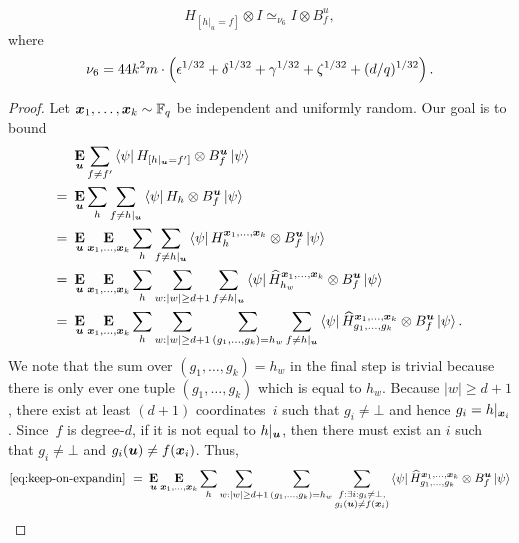 \begin{lemma}\label{lem:h-b-consistency}
\begin{equation*}
H_{[h|_u =f]} \otimes I \simeq_{\nu_6} I \otimes B^u_f,
\end{equation*}
where
\begin{equation*}
\nu_6 = 44 k^2m \cdot \left(\epsilon^{1/32} + \delta^{1/32} + \gamma^{1/32} + \zeta^{1/32} + (d/q)^{1/32}\right).
\end{equation*}
\end{lemma}
\begin{proof}
Let ${\boldsymbol{x}}_1, \ldots, {\boldsymbol{x}}_k \sim \mathbb F_q$ be independent and uniformly random.
Our goal is to bound
\begin{align}
&\mathop{\bf E\/}_{\boldsymbol{u}} \sum_{f \neq f'} \bra{\psi} H_{[h|_{\boldsymbol{u}} = f']} \otimes B^{\boldsymbol{u}}_f \ket{\psi}\nonumber\\
=~&\mathop{\bf E\/}_{\boldsymbol{u}} \sum_{h}\sum_{f \neq h|_{\boldsymbol{u}}} \bra{\psi} H_{h} \otimes B^{\boldsymbol{u}}_f \ket{\psi}\nonumber\\
=~&\mathop{\bf E\/}_{\boldsymbol{u}}\mathop{\bf E\/}_{{\boldsymbol{x}}_1, \ldots, {\boldsymbol{x}}_k} \sum_{h}\sum_{f \neq h|_{\boldsymbol{u}}} \bra{\psi} H^{{\boldsymbol{x}}_1, \ldots, {\boldsymbol{x}}_k}_{h} \otimes B^{\boldsymbol{u}}_f \ket{\psi}\nonumber\\
=~&\mathop{\bf E\/}_{\boldsymbol{u}}\mathop{\bf E\/}_{{\boldsymbol{x}}_1, \ldots, {\boldsymbol{x}}_k} \sum_{h} \sum_{w: |w| \geq d+1} \sum_{f \neq h|_{\boldsymbol{u}}} \bra{\psi} \widehat{H}^{{\boldsymbol{x}}_1, \ldots, {\boldsymbol{x}}_k}_{h_w} \otimes B^{\boldsymbol{u}}_f \ket{\psi}\nonumber\\
=~&\mathop{\bf E\/}_{\boldsymbol{u}}\mathop{\bf E\/}_{{\boldsymbol{x}}_1, \ldots, {\boldsymbol{x}}_k} \sum_{h} \sum_{w: |w| \geq d+1} \sum_{(g_1, \ldots, g_k) = h_w} \sum_{f \neq h|_{\boldsymbol{u}}} \bra{\psi} \widehat{H}^{{\boldsymbol{x}}_1, \ldots, {\boldsymbol{x}}_k}_{g_1, \ldots, g_k} \otimes B^{\boldsymbol{u}}_f \ket{\psi}.\label{eq:keep-on-expandin}
\end{align}
We note that the sum over $(g_1, \ldots, g_k) = h_w$ in the final step is trivial
because there is only ever one tuple $(g_1, \ldots, g_k)$ which is equal to $h_w$.
Because $|w| \geq d+1$,
there exist at least $(d+1)$ coordinates~$i$ such that $g_i \neq \bot$
and hence $g_i = h|_{{\boldsymbol{x}}_i}$.
Since~$f$ is degree-$d$, if it is not equal to $h|_{\boldsymbol{u}}$,
then there must exist an $i$ such that $g_i \neq \bot$ and $g_i(\boldsymbol{u}) \neq f({\boldsymbol{x}}_i)$.
Thus,
\begin{align}
\eqref{eq:keep-on-expandin}
~=~& \E_{\bu}\E_{\bx_1, \ldots, \bx_k} \sum_{h} \sum_{w: |w| \geq d+1} \sum_{(g_1, \ldots, g_k) = h_w} \sum_{\substack{f: \exists i: g_i \neq \bot, \\g_i(\bu) \neq f(\bx_i)} }\bra{\psi} \widehat{H}^{\bx_1, \ldots, \bx_k}_{g_1, \ldots, g_k} \otimes B^{\bu}_f \ket{\psi}\nonumber\\

\end{align}
\end{proof}
